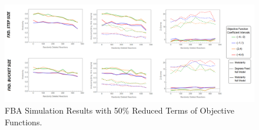 \begin{landscape}
	\vspace*{\fill}
	\begin{figure}[ht]
		\centering
		\includegraphics[width=1\hsize]{../images/results-obj_func_terms_reduced50-simulation-results.png}
		\caption{FBA Simulation Results with 50\% Reduced Terms of Objective Functions.}
		\label{figure-supplements-obj_func-terms-reduced50}
	\end{figure}
	\vspace*{\fill}
\end{landscape}
